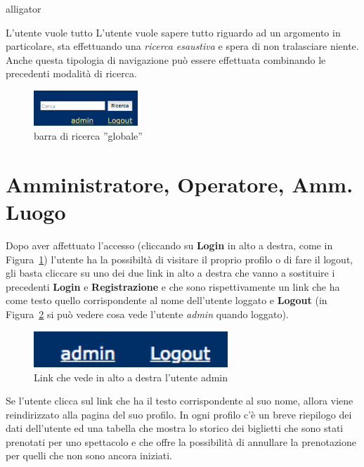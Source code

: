 \documentclass[10pt, a4paper]{article}
\begin{document}
\begin{labeling}{alligator}
  \item[L'utente vuole tutto] L'utente vuole sapere tutto riguardo ad un 
    argomento in particolare, sta effettuando una \emph{ricerca esaustiva}
    e spera di non tralasciare niente. 
    Anche questa tipologia di navigazione può essere effettuata combinando le precedenti modalità di ricerca.

    \begin{figure}[h!]
      \centering
      \includegraphics[width=0.35\textwidth]{Images/barra_ricerca.png}
      \caption{barra di ricerca ''globale''}
      \label{fig:barra_ricerca}
    \end{figure}

\end{labeling}

\section{Amministratore, Operatore, Amm. Luogo}
Dopo aver affettuato l'accesso (cliccando su \textbf{Login} in alto a destra, come in
Figura~\ref{fig:barra_ricerca}) l'utente ha la possibiltà di visitare il proprio profilo o di fare
il logout, gli basta cliccare su uno dei due link in alto a destra che vanno a sostituire
i precedenti \textbf{Login} e \textbf{Registrazione} e che sono rispettivamente 
un link che ha come testo quello corrispondente al nome dell'utente loggato e \textbf{Logout}
(in Figura~\ref{fig:admin_loggato} si può vedere cosa vede l'utente \emph{admin} quando loggato).
\begin{figure}[h!]
	\centering
	\includegraphics[width=0.65\textwidth]{Images/admin_loggato.png}
	\caption{Link che vede in alto a destra l'utente admin}
	\label{fig:admin_loggato}
\end{figure}

Se l'utente clicca sul link che ha il testo corrispondente al suo nome, allora viene reindirizzato alla
pagina del suo profilo. In ogni profilo c'è un breve riepilogo dei dati dell'utente ed una tabella
che mostra lo storico  dei biglietti che sono stati prenotati per uno spettacolo e che offre la possibilità di
annullare la prenotazione per quelli che non sono ancora iniziati.
\end{document}
